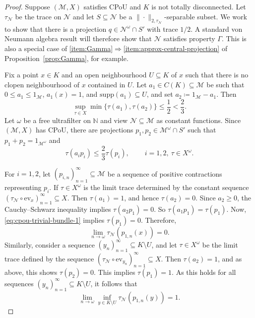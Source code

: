 \documentclass[a4paper,11pt]{amsart}
\theoremstyle{definition}
\numberwithin{equation}{section}
\numberwithin{theorem}{section}
\newcommand{\M}{\mathcal{M}}
\begin{document}
\begin{proof}
	Suppose $(\M, X)$ satisfies CPoU and $K$ is not totally disconnected.  Let $\tau_{\mathcal N}$ be the trace on $\mathcal N$ and let $S \subseteq \mathcal N$ be a $\|\cdot\|_{2, \tau_\mathcal N}$-separable subset.  We work to show that there is a projection $q \in \mathcal{N}^\omega \cap S'$ with trace $1/2$.  A standard von Neumann algebra result will therefore show that $\mathcal N$ satisfies property $\Gamma$.  This is also a special case of \ref{item:Gamma}$\Rightarrow$\ref{item:approx-central-projection} of Proposition~\ref{prop:Gamma}, for example.
	
	Fix a point $x \in K$ and an open neighbourhood $U \subseteq K$ of $x$ such that there is no clopen neighbourhood of $x$ contained in $U$.  Let $a_1 \in C(K) \subseteq \M$ be such that $0 \leq a_1 \leq 1_{\mathcal M}$, $a_1(x) = 1$, and $\mathrm{supp}(a_1) \subseteq U$, and set $a_2 \coloneqq 1_{\mathcal M}- a_1$.  Then
	\begin{equation}
		\sup_{\tau \in X} \min \{\tau(a_1), \tau(a_2) \} \leq \frac12 < \frac23.
	\end{equation}
	Let $\omega$ be a free ultrafilter on $\mathbb N$ and view $\mathcal N \subseteq \mathcal M$ as constant functions.  Since $(\M, X)$ has CPoU, there are projections $p_1, p_2 \in \M^\omega \cap S'$ such that $p_1 + p_2 = 1_{\mathcal M^\omega}$ and
	\begin{equation}\label{eq:cpou-trivial-bundle-1}
		\tau(a_i p_i) \leq \frac23 \tau(p_i), \qquad \ i=1, 2,\ \tau \in X^\omega.
	\end{equation}
	
	For $i = 1,2$, let $(p_{i, n})_{n=1}^\infty \subseteq \M$ be a sequence of positive contractions representing $p_i$.  If $\tau \in X^\omega$ is the limit trace determined by the constant sequence $(\tau_{\mathcal N} \circ \mathrm{ev}_x)_{n=1}^\infty \subseteq X$.  Then $\tau(a_1) = 1$, and hence $\tau(a_2) = 0$.  Since $a_2\geq 0$, the Cauchy--Schwarz inequality implies  $\tau(a_2 p_1) = 0$.  So $\tau(a_1 p_1) = \tau(p_1)$.  Now, \eqref{eq:cpou-trivial-bundle-1} implies $\tau(p_1) = 0$.  Therefore,
	\begin{equation}\label{eq:cpou-trivial-bundle-2}
		\lim_{n \rightarrow \omega} \tau_{\mathcal N}(p_{1, n}(x)) = 0.
	\end{equation}
	Similarly, consider a sequence $(y_n)_{n=1}^\infty \subseteq K \setminus U$, and let $\tau \in X^\omega$ be the limit trace defined by the sequence $(\tau_{\mathcal N} \circ \mathrm{ev}_{y_n})_{n=1}^\infty \subseteq X$.  Then $\tau(a_2) = 1$, and as above, this shows $\tau(p_2) = 0$.  This implies $\tau(p_1) = 1$.  As this holds for all sequences $(y_n)_{n=1}^\infty \subseteq K \setminus U$, it follows that
	\begin{equation}\label{eq:cpou-trivial-bundle-3} 
		\lim_{n \rightarrow \omega} \inf_{y \in K \setminus U} \tau_{\mathcal N}(p_{1, n}(y)) = 1.
	\end{equation}
	

\end{proof}
\end{document}
